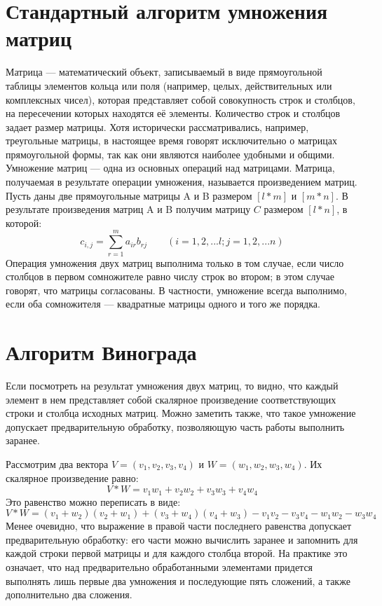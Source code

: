 \documentclass[12pt]{report}
\begin{document}
	\section{Стандартный алгоритм умножения матриц}
	Матрица — математический объект, записываемый в виде прямоугольной таблицы элементов кольца или поля (например, целых, действительных или комплексных чисел), которая представляет собой совокупность строк и столбцов, на пересечении которых находятся её элементы. Количество строк и столбцов задает размер матрицы. Хотя исторически рассматривались, например, треугольные матрицы, в настоящее время говорят исключительно о матрицах прямоугольной формы, так как они являются наиболее удобными и общими. 
	Умножение матриц — одна из основных операций над матрицами. Матрица, получаемая в результате операции умножения, называется произведением матриц.
	Пусть даны две прямоугольные матрицы A и B размером $[l * m]$ и $[m * n]$. В результате произведения матриц A и B получим матрицу $C$ размером $[l * n]$, в которой:
	\begin{equation}
		c_{i,j} = \sum_{r=1}^{m}a_{ir}b_{rj} \qquad (i=1,2,...l; j = 1,2,...n)
	\end{equation}
	Операция умножения двух матриц выполнима только в том случае, если число столбцов в первом сомножителе равно числу строк во втором; в этом случае говорят, что матрицы согласованы. В частности, умножение всегда выполнимо, если оба сомножителя — квадратные матрицы одного и того же порядка. 
	
	\section{Алгоритм Винограда}
	Если посмотреть на результат умножения двух матриц, то видно, что каждый элемент в нем представляет собой скалярное произведение соответствующих строки и столбца исходных матриц. Можно заметить также, что такое умножение допускает предварительную обработку, позволяющую часть работы выполнить заранее. \par
	Рассмотрим два вектора $V = (v_{1},v_{2},v_{3},v_{4})$ и $W = (w_{1},w_{2},w_{3},w_{4})$. Их скалярное произведение равно:
	\begin{equation}
		V * W = v_{1}w_{1} + v_{2}w_{2} + v_{3}w_{3} + v_{4}w_{4}
	\end{equation}
	Это равенство можно переписать в виде:
	\begin{equation}
		V * W = (v_{1} + w_{2})(v_{2} + w_{1}) + (v_{3} + w_{4})(v_{4} + w_{3}) -  v_{1}v_{2} - v_{3}v_{4} - w_{1}w_{2} - w_{3}w_{4}
	\end{equation}
	Менее очевидно, что выражение в правой части последнего равенства допускает предварительную обработку: его части можно вычислить заранее и запомнить для каждой строки первой матрицы и для каждого столбца второй. На практике это означает, что над предварительно обработанными элементами придется выполнять лишь первые два умножения и последующие пять сложений, а также дополнительно два сложения. 
	
\end{document}
